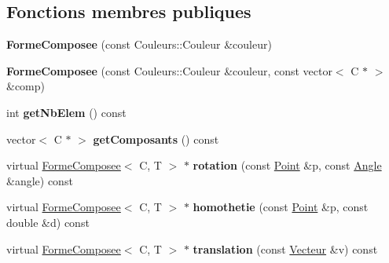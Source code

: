\subsection*{Fonctions membres publiques}
\begin{DoxyCompactItemize}
\item 
\hypertarget{class_forme_composee_ac2e1bc2fe2bd15ea64f54437506efc23}{{\bfseries Forme\+Composee} (const Couleurs\+::\+Couleur \&couleur)}\label{class_forme_composee_ac2e1bc2fe2bd15ea64f54437506efc23}

\item 
\hypertarget{class_forme_composee_a1cf7d4f5a75aca415db4c82b4ce58bc2}{{\bfseries Forme\+Composee} (const Couleurs\+::\+Couleur \&couleur, const vector$<$ C $\ast$ $>$ \&comp)}\label{class_forme_composee_a1cf7d4f5a75aca415db4c82b4ce58bc2}

\item 
\hypertarget{class_forme_composee_a2b08c0c0862c3add1a8acd73d0636d4e}{int {\bfseries get\+Nb\+Elem} () const }\label{class_forme_composee_a2b08c0c0862c3add1a8acd73d0636d4e}

\item 
\hypertarget{class_forme_composee_ac2eca4ffa3fa09c1b1c3b87b5536cf93}{vector$<$ C $\ast$ $>$ {\bfseries get\+Composants} () const }\label{class_forme_composee_ac2eca4ffa3fa09c1b1c3b87b5536cf93}

\item 
\hypertarget{class_forme_composee_a77ec5853c218184f5cd4fd44b98c99a1}{virtual \hyperlink{class_forme_composee}{Forme\+Composee}$<$ C, T $>$ $\ast$ {\bfseries rotation} (const \hyperlink{class_point}{Point} \&p, const \hyperlink{class_angle}{Angle} \&angle) const }\label{class_forme_composee_a77ec5853c218184f5cd4fd44b98c99a1}

\item 
\hypertarget{class_forme_composee_ac9092340280d7c1dc41aef2468a30752}{virtual \hyperlink{class_forme_composee}{Forme\+Composee}$<$ C, T $>$ $\ast$ {\bfseries homothetie} (const \hyperlink{class_point}{Point} \&p, const double \&d) const }\label{class_forme_composee_ac9092340280d7c1dc41aef2468a30752}

\item 
\hypertarget{class_forme_composee_a7657bdc10df7702ac89646347c273438}{virtual \hyperlink{class_forme_composee}{Forme\+Composee}$<$ C, T $>$ $\ast$ {\bfseries translation} (const \hyperlink{class_vecteur}{Vecteur} \&v) const }\label{class_forme_composee_a7657bdc10df7702ac89646347c273438}

\end{DoxyCompactItemize}
